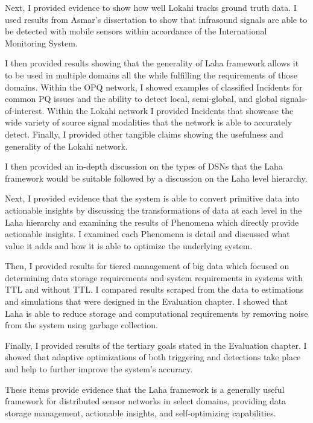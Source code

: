 Next, I provided evidence to show how well Lokahi tracks ground truth data. I used results from Asmar's dissertation to show that infrasound signals are able to be detected with mobile sensors within accordance of the International Monitoring System.

I then provided results showing that the generality of Laha framework allows it to be used in multiple domains all the while fulfilling the requirements of those domains. Within the OPQ network, I showed examples of classified Incidents for common PQ issues and the ability to detect local, semi-global, and global signals-of-interest. Within the Lokahi network I provided Incidents that showcase the wide variety of source signal modalities that the network is able to accurately detect. Finally, I provided other tangible claims showing the usefulness and generality of the Lokahi network.

I then provided an in-depth discussion on the types of DSNs that the Laha framework would be suitable followed by a discussion on the Laha level hierarchy.

Next, I provided evidence that the system is able to convert primitive data into actionable insights by discussing the transformations of data at each level in the Laha hierarchy and examining the results of Phenomena which directly provide actionable insights. I examined each Phenomena is detail and discussed what value it adds and how it is able to optimize the underlying system.

Then, I provided results for tiered management of big data which focused on determining data storage requirements and system requirements in systems with TTL and without TTL. I compared results scraped from the data to estimations and simulations that were designed in the Evaluation chapter. I showed that Laha is able to reduce storage and computational requirements by removing noise from the system using garbage collection.

Finally, I provided results of the tertiary goals stated in the Evaluation chapter. I showed that adaptive optimizations of both triggering and detections take place and help to further improve the system's accuracy.

These items provide evidence that the Laha framework is a generally useful framework for distributed sensor networks in select domains, providing data storage management, actionable insights, and self-optimizing capabilities.


